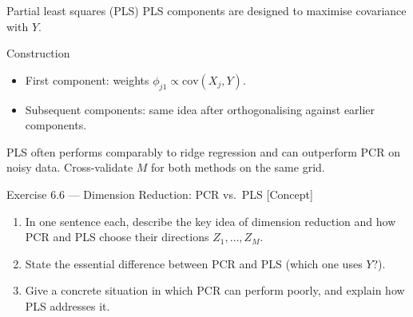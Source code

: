 \documentclass[aspectratio=169,11pt]{beamer}
\begin{document}
\begin{frame}{Partial least squares (PLS)}
  PLS components are designed to maximise covariance with $Y$.
  \begin{block}{Construction}
    \begin{itemize}
      \item First component: weights $\phi_{j1} \propto \mathrm{cov}(X_j, Y)$.
      \item Subsequent components: same idea after orthogonalising
            against earlier components.
    \end{itemize}
  \end{block}
  \begin{takeaway}
    PLS often performs comparably to ridge regression and can
    outperform PCR on noisy data. Cross-validate $M$ for both methods
    on the same grid.
  \end{takeaway}
\end{frame}

\begin{frame}{Exercise 6.6 --- Dimension Reduction: PCR vs.\ PLS [Concept]}
  \begin{exercise}
    \begin{enumerate}
      \item In one sentence each, describe the key idea of dimension
            reduction and how PCR and PLS choose their directions
            $Z_1,\dots,Z_M$.
      \item State the essential difference between PCR and PLS (which one
            uses $Y$?).
      \item Give a concrete situation in which PCR can perform poorly,
            and explain how PLS addresses it.
    \end{enumerate}
  \end{exercise}
\end{frame}
\end{document}
